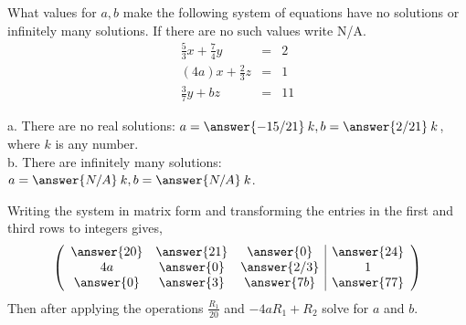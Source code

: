 \documentclass{ximera}
\author{Parisa Fatheddin}
\begin{document}
\begin{exercise} What values for $a,b$ make the following system of equations have no solutions or infinitely many solutions. If there are no such values write N/A.
\begin{eqnarray*}
\frac{5}{3}x + \frac{7}{4}y &=& 2\\
(4a)x + \frac{2}{3}z &=& 1\\
\frac{3}{7} y + bz &=& 11
\end{eqnarray*}
\begin{prompt}
a. There are no real solutions: $a = \answer{-15/21}\hspace{.08cm}k, b= \answer{2/21}\hspace{.08cm}k$, where $k$ is any number. \\
b. There are infinitely many solutions: $a = \answer{N/A} \hspace{.08cm}k, b= \answer{N/A}\hspace{.08cm}k$.
\begin{hint}
Writing the system in matrix form and transforming the entries in the first and third rows to integers gives,
\[
\left(\begin{array}{ccc|c}
  \answer{20} &  \answer{21} & \answer{0} &\answer{24} \\
  4a &  \answer{0} & \answer{2/3} & 1\\
  \answer{0} &  \answer{3} & \answer{7b} & \answer{77}
\end{array}\right)
\]
Then after applying the operations $\frac{R_{1}}{20}$ and $-4a R_{1} + R_{2}$ solve for $a$ and $b$.
\end{hint}
\end{prompt}
\end{exercise}
\end{document}
